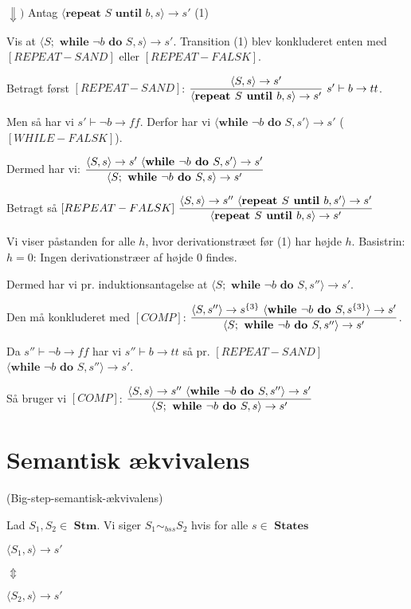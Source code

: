 \documentclass[a4paper,10pt,article]{memoir}
\theoremstyle{definition}
\begin{document}
\begin{bevis}
$\Downarrow )$ Antag $\langle \textbf{repeat } S \textbf{ until } b,s \rangle \rightarrow s'$   (1)

Vis at $\langle S; \textbf{ while } \neg b \textbf{ do } S,s \rangle \rightarrow s'$. Transition (1) blev konkluderet enten med $[REPEAT-SAND]$ eller $[REPEAT-FALSK]$. 

Betragt først $[REPEAT-SAND]$: $\dfrac{\langle S,s \rangle \rightarrow s'}{\langle \textbf{repeat } S \textbf{ until } b,s \rangle \rightarrow s'} \text{   } s' \vdash b \rightarrow tt$. 

Men så har vi $s' \vdash \neg b \rightarrow ff$. Derfor har vi $\langle \textbf{while } \neg b \textbf{ do } S,s' \rangle \rightarrow s'$ ($[WHILE-FALSK]$). 

Dermed har vi: $\dfrac{\langle S,s \rangle \rightarrow s' \text{  } \langle \textbf{while } \neg b \textbf{ do } S,s' \rangle \rightarrow s'}{\langle S; \textbf{ while } \neg b \textbf{ do } S,s \rangle \rightarrow s'}$

Betragt så $[REPEAT-FALSK] \text{   } \dfrac{\langle S,s \rangle \rightarrow s'' \text{  } \langle \textbf{repeat } S \textbf{ until } b,s' \rangle \rightarrow s'}{\langle \textbf{repeat } S \textbf{ until } b,s \rangle \rightarrow s'}$

Vi viser påstanden for alle $h$, hvor derivationstræet før (1) har højde $h$. Basistrin: $h = 0$: Ingen derivationstræer af højde 0 findes.

Dermed har vi pr. induktionsantagelse at $\langle S; \textbf{ while } \neg b \textbf{ do } S,s'' \rangle \rightarrow s'$. 

Den må konkluderet med $[COMP]$: $\dfrac{\langle S,s'' \rangle \rightarrow s^{\{3\}} \text{  } \langle \textbf{while } \neg b \textbf{ do } S,s^{\{3\}} \rangle \rightarrow s'}{\langle S; \textbf{ while } \neg b \textbf{ do } S,s'' \rangle \rightarrow s'}$. 

Da $s'' \vdash \neg b \rightarrow ff$ har vi $s'' \vdash b \rightarrow tt$ så pr. $[REPEAT-SAND]$ $\langle \textbf{while } \neg b \textbf{ do } S,s'' \rangle \rightarrow s'$. 

Så bruger vi $[COMP]$: $\dfrac{\langle S,s \rangle \rightarrow s'' \text{  } \langle \textbf{while } \neg b \textbf{ do } S,s'' \rangle \rightarrow s'}{\langle S; \textbf{ while } \neg b \textbf{ do } S,s \rangle \rightarrow s'}$
\end{bevis}
\chapter{Semantisk ækvivalens}
\begin{definition}
(Big-step-semantisk-ækvivalens)

Lad $S_1 , S_2 \in \textbf{ Stm}$. Vi siger $S_1 \sim_{bss} S_2$ hvis for alle $s \in \textbf{ States}$

$\langle S_1 ,s \rangle \rightarrow s'$

$\Updownarrow$

$\langle S_2 ,s \rangle \rightarrow s'$
\end{definition}
\end{document}
